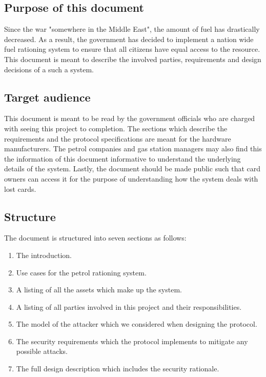 \subsection{Purpose of this document}

Since the war "somewhere in the Middle East", the amount of fuel has drastically decreased. As a result, the government has decided to implement a nation wide fuel rationing system to ensure that all citizens have equal access to the resource. This document is meant to describe the involved parties, requirements and design decisions of a such a system. 

\subsection{Target audience}

This document is meant to be read by the government officials who are charged with seeing this project to completion. The sections which describe the requirements and the protocol specifications are meant for the hardware manufacturers. The petrol companies and gas station managers may also find this the information of this document informative to understand the underlying details of the system. Lastly, the document should be made public such that card owners can access it for the purpose of understanding how the system deals with lost cards.

\subsection{Structure}

The document is structured into seven sections as follows:
\begin{enumerate}
  \item The introduction.
  \item Use cases for the petrol rationing system.
  \item A listing of all the assets which make up the system.
  \item A listing of all parties involved in this project and their responsibilities.
  \item The model of the attacker which we considered when designing the protocol.
  \item The security requirements which the protocol implements to mitigate any possible attacks.
  \item The full design description which includes the security rationale.
\end{enumerate}